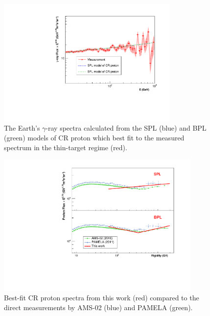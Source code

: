 \begin{figure}[h!]
    \centering
    \includegraphics[width=0.8\textwidth]{content/result_and_discussion/figures/fitted_result.pdf}
    \caption{
        The Earth's $\gamma$-ray spectra calculated from the SPL (blue)
        and BPL (green) models of CR proton which best fit to the measured
        spectrum in the thin-target
        regime (red).
    }
    \label{fig:fitted_gamma_specgtrum}
\end{figure}


\begin{figure}[h!]
    \centering
    \includegraphics[width=0.9\textwidth]{content/result_and_discussion/figures/ProtonSpectrumModelMeasurement.pdf}
    \caption{
        Best-fit CR proton spectra from this work (red)
        compared to the direct measurements by AMS-02 (blue) and
        PAMELA (green).
    }
    \label{fig:fitted_cr_proton}
\end{figure}


